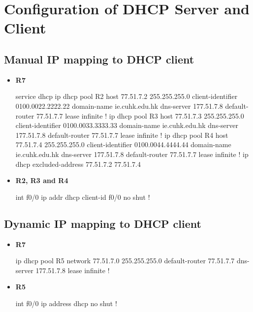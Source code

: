 \documentclass[10pt]{article}
\begin{document}
\section{Configuration of DHCP Server and Client}
\subsection{Manual IP mapping to DHCP client}
\begin{itemize}
\item {\bf R7}
\begin{verbatim*}
service dhcp
ip dhcp pool R2
 host 77.51.7.2 255.255.255.0
 client-identifier 0100.0022.2222.22
 domain-name ie.cuhk.edu.hk
 dns-server 177.51.7.8
 default-router 77.51.7.7
 lease infinite
!
ip dhcp pool R3
 host 77.51.7.3 255.255.255.0
 client-identifier 0100.0033.3333.33
 domain-name ie.cuhk.edu.hk
 dns-server 177.51.7.8
 default-router 77.51.7.7
 lease infinite
!
ip dhcp pool R4
 host 77.51.7.4 255.255.255.0
 client-identifier 0100.0044.4444.44
 domain-name ie.cuhk.edu.hk
 dns-server 177.51.7.8
 default-router 77.51.7.7
 lease infinite
!
ip dhcp excluded-address 77.51.7.2 77.51.7.4
\end{verbatim*}
\item {\bf R2, R3 and R4}
\begin{verbatim*}
int f0/0
 ip addr dhcp client-id f0/0
 no shut
!
\end{verbatim*}
\end{itemize}
\subsection{Dynamic IP mapping to DHCP client}
\begin{itemize}
\item {\bf R7}
\begin{verbatim*}
ip dhcp pool R5
 network 77.51.7.0 255.255.255.0
 default-router 77.51.7.7
 dns-server 177.51.7.8
 lease infinite
!
\end{verbatim*}
\item {\bf R5}
\begin{verbatim*}
int f0/0
 ip address dhcp
 no shut
!
\end{verbatim*}
\end{itemize}
\end{document}
